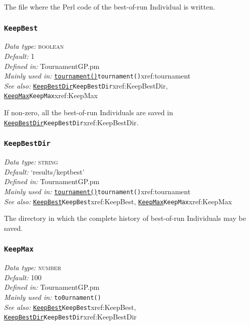 \documentclass[a4paper]{article}
\begin{document}
The file where the Perl code of the best-of-run Individual is written.

\subsubsection{\texttt{KeepBest}}\label{xref:KeepBest}
\begin{flushleft}
\textit{Data type:} \textsc{boolean}\\
\textit{Default:} 1\\
\textit{Defined in:} TournamentGP.pm\\
\textit{Mainly used in:} \hyperref[no]{\texttt{tournament()}}{\texttt{tournament()}}{xref:tournament}\\
\textit{See also:} \hyperref[no]{\texttt{KeepBestDir}}{\texttt{KeepBestDir}}{xref:KeepBestDir}, \hyperref[no]{\texttt{KeepMax}}{\texttt{KeepMax}}{xref:KeepMax}
\end{flushleft}

If non-zero, all the best-of-run Individuals are saved in
\hyperref[no]{\texttt{KeepBestDir}}{\texttt{KeepBestDir}}{xref:KeepBestDir}.

\subsubsection{\texttt{KeepBestDir}}\label{xref:KeepBestDir}
\begin{flushleft}
\textit{Data type:} \textsc{string}\\
\textit{Default:} `results/keptbest'\\
\textit{Defined in:} TournamentGP.pm\\
\textit{Mainly used in:} \hyperref[no]{\texttt{tournament()}}{\texttt{tournament()}}{xref:tournament}\\
\textit{See also:} \hyperref[no]{\texttt{KeepBest}}{\texttt{KeepBest}}{xref:KeepBest}, \hyperref[no]{\texttt{KeepMax}}{\texttt{KeepMax}}{xref:KeepMax}
\end{flushleft}

The directory in which the complete history of best-of-run Individuals
may be saved.

\subsubsection{\texttt{KeepMax}}\label{xref:KeepMax}
\begin{flushleft}
\textit{Data type:} \textsc{number}\\
\textit{Default:} 100\\
\textit{Defined in:} TournamentGP.pm\\
\textit{Mainly used in:} \texttt{to0urnament()}\\
\textit{See also:} \hyperref[no]{\texttt{KeepBest}}{\texttt{KeepBest}}{xref:KeepBest}, \hyperref[no]{\texttt{KeepBestDir}}{\texttt{KeepBestDir}}{xref:KeepBestDir}
\end{flushleft}
\end{document}
